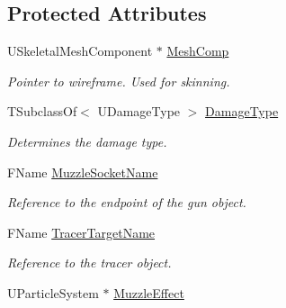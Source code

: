 \subsection*{Protected Attributes}
\begin{DoxyCompactItemize}
\item 
\mbox{\label{class_a_my_weapon___gun_ae5cc40d0c60ca3a5120acf10a1b1f4c7}} 
U\+Skeletal\+Mesh\+Component $\ast$ \mbox{\hyperlink{class_a_my_weapon___gun_ae5cc40d0c60ca3a5120acf10a1b1f4c7}{Mesh\+Comp}}
\begin{DoxyCompactList}\small\item\em Pointer to wireframe. Used for skinning. \end{DoxyCompactList}\item 
\mbox{\label{class_a_my_weapon___gun_a8d5171dbf961d142e836c08c61042fd1}} 
T\+Subclass\+Of$<$ U\+Damage\+Type $>$ \mbox{\hyperlink{class_a_my_weapon___gun_a8d5171dbf961d142e836c08c61042fd1}{Damage\+Type}}
\begin{DoxyCompactList}\small\item\em Determines the damage type. \end{DoxyCompactList}\item 
\mbox{\label{class_a_my_weapon___gun_a3be0763373c47e77d857658ad55a78b9}} 
F\+Name \mbox{\hyperlink{class_a_my_weapon___gun_a3be0763373c47e77d857658ad55a78b9}{Muzzle\+Socket\+Name}}
\begin{DoxyCompactList}\small\item\em Reference to the endpoint of the gun object. \end{DoxyCompactList}\item 
\mbox{\label{class_a_my_weapon___gun_a8c55f6a25191a005d54c60ab9fe2c416}} 
F\+Name \mbox{\hyperlink{class_a_my_weapon___gun_a8c55f6a25191a005d54c60ab9fe2c416}{Tracer\+Target\+Name}}
\begin{DoxyCompactList}\small\item\em Reference to the tracer object. \end{DoxyCompactList}\item 
\mbox{\label{class_a_my_weapon___gun_a679469b189976f66e5c55f9fdeccb885}} 
U\+Particle\+System $\ast$ \mbox{\hyperlink{class_a_my_weapon___gun_a679469b189976f66e5c55f9fdeccb885}{Muzzle\+Effect}}

\end{DoxyCompactItemize}
